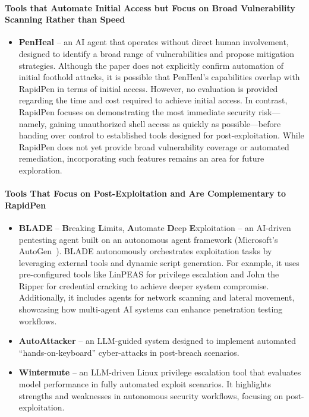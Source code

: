 \paragraph{Tools that Automate Initial Access but Focus on Broad Vulnerability Scanning Rather than Speed}
\begin{itemize}
    \item \textbf{PenHeal} \cite{penheal2023} – an AI agent that operates without direct human involvement, designed to identify a broad range of vulnerabilities and propose mitigation strategies. Although the paper does not explicitly confirm automation of initial foothold attacks, it is possible that PenHeal’s capabilities overlap with RapidPen in terms of initial access. However, no evaluation is provided regarding the time and cost required to achieve initial access. In contrast, RapidPen focuses on demonstrating the most immediate security risk—namely, gaining unauthorized shell access as quickly as possible—before handing over control to established tools designed for post-exploitation. While RapidPen does not yet provide broad vulnerability coverage or automated remediation, incorporating such features remains an area for future exploration.
\end{itemize}

\paragraph{Tools That Focus on Post-Exploitation and Are Complementary to RapidPen}
\begin{itemize}
    \item \textbf{BLADE} \cite{blade2024} – \textbf{B}reaking \textbf{L}imits, \textbf{A}utomate \textbf{D}eep \textbf{E}xploitation – an AI-driven pentesting agent built on an autonomous agent framework (Microsoft’s AutoGen~\cite{autogen2023}). BLADE autonomously orchestrates exploitation tasks by leveraging external tools and dynamic script generation. For example, it uses pre-configured tools like LinPEAS for privilege escalation and John the Ripper for credential cracking to achieve deeper system compromise. Additionally, it includes agents for network scanning and lateral movement, showcasing how multi-agent AI systems can enhance penetration testing workflows.
    \item \textbf{AutoAttacker} \cite{autoattacker2024} – an LLM-guided system designed to implement automated “hands-on-keyboard” cyber-attacks in post-breach scenarios.
    \item \textbf{Wintermute} \cite{happe2023wintermute} – an LLM-driven Linux privilege escalation tool that evaluates model performance in fully automated exploit scenarios. It highlights strengths and weaknesses in autonomous security workflows, focusing on post-exploitation.
\end{itemize}

